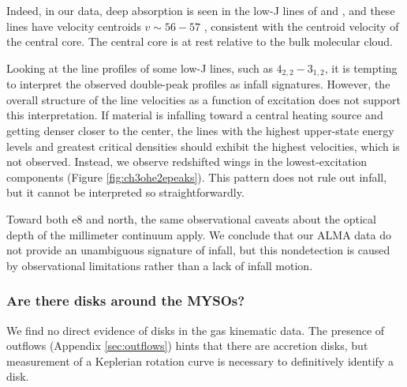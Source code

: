 \documentclass{emulateapj}
\begin{document}
Indeed, in our data, deep absorption is seen in the low-J lines of
\formaldehyde and \methanol, and these lines have velocity centroids
$v\sim56-57$ \kms, consistent with the centroid velocity of the central core.
The central core is at rest relative to the bulk molecular cloud.

Looking at the line profiles of some low-J lines, such as \methanol
$4_{2,2}-3_{1,2}$, it is tempting to interpret the observed double-peak
profiles as infall signatures.  However, the overall structure of the line
velocities as a function of excitation does not support this interpretation.
If material is infalling toward a central heating source and getting denser
closer to the center, the lines with the highest upper-state energy
levels and greatest critical densities should exhibit the highest
velocities, which is not observed.  Instead, we observe redshifted
wings in the lowest-excitation components (Figure \ref{fig:ch3ohe2epeaks}).
This pattern does not rule out infall, but it cannot be interpreted
so straightforwardly. 





Toward both e8 and north, the same observational caveats about the optical
depth of the millimeter continuum apply.  We conclude that our ALMA data do
not provide an unambiguous signature of infall, but this nondetection is caused
by observational limitations rather than a lack of infall motion.

\subsubsection{Are there disks around the MYSOs?}
\label{sec:disks}
We find no direct evidence of disks in the gas kinematic data.  The presence of
outflows (Appendix \ref{sec:outflows}) hints that there are accretion disks,
but measurement of a Keplerian rotation curve is necessary to definitively
identify a disk.
\end{document}
